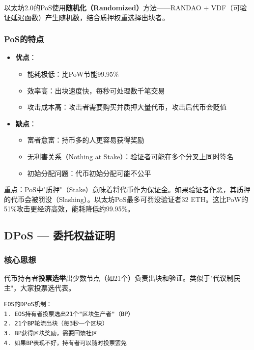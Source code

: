 ﻿\documentclass[12pt,a4paper]{article}
\begin{document}
以太坊2.0的PoS使用\textbf{随机化（Randomized）}方法——RANDAO + VDF（可验证延迟函数）产生随机数，结合质押权重选择出块者。

\subsubsection{PoS的特点}

\begin{itemize}[leftmargin=1.5em]
\item \textbf{优点}：
  \begin{itemize}
  \item 能耗极低：比PoW节能99.95\%
  \item 效率高：出块速度快，每秒可处理数千笔交易
  \item 攻击成本高：攻击者需要购买并质押大量代币，攻击后代币会贬值
  \end{itemize}
\item \textbf{缺点}：
  \begin{itemize}
  \item 富者愈富：持币多的人更容易获得奖励
  \item 无利害关系（Nothing at Stake）：验证者可能在多个分叉上同时签名
  \item 初始分配问题：代币初始分配可能不公平
  \end{itemize}
\end{itemize}

\begin{keypointbox}
重点：PoS中"质押"（Stake）意味着将代币作为保证金。如果验证者作恶，其质押的代币会被罚没（Slashing）。以太坊PoS最多可罚没验证者32 ETH。这比PoW的51\%攻击更经济高效，能耗降低约99.95\%。
\end{keypointbox}

\subsection{DPoS — 委托权益证明}

\subsubsection{核心思想}

代币持有者\textbf{投票选举}出少数节点（如21个）负责出块和验证。类似于"代议制民主"，大家投票选代表。

\begin{lstlisting}
EOS的DPoS机制：
1. EOS持有者投票选出21个"区块生产者"（BP）
2. 21个BP轮流出块（每3秒一个区块）
3. BP获得区块奖励，需要回馈社区
4. 如果BP表现不好，持有者可以随时投票罢免
\end{lstlisting}
\end{document}
